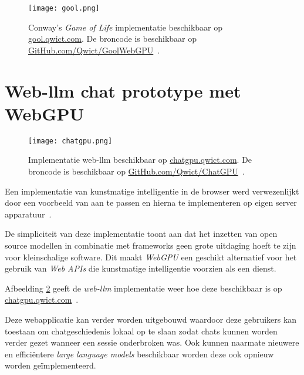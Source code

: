 \begin{figure}
    \texttt{[image: gool.png]}
    \caption[Conway's \textit{Game of Life} implementatie~\autocite{Qwict2024}]{
        Conway's \textit{Game of Life} implementatie beschikbaar op \href{https://gool.qwict.com}{gool.qwict.com}. De broncode is beschikbaar op \href{https://github.com/qwict/GoolWebGPU}{GitHub.com/Qwict/GoolWebGPU}~\autocite{google2023, Qwict2024}.
    }
    \label{fig:Conway's Game of Life}
\end{figure}

\break{}

\iffalse
TODO Dit moet verder in detail worden beschreven
\fi

\section{Web-llm chat prototype met WebGPU}
\label{sec:chatgpu}
\begin{figure}
    \texttt{[image: chatgpu.png]}
    \caption[Implementatie web-llm~\autocite{mlcai2023, Qwict2024a}]{
        Implementatie web-llm beschikbaar op \href{https://chatgpu.qwict.com}{chatgpu.qwict.com}. De broncode is beschikbaar op \href{https://github.com/qwict/chatgpu}{GitHub.com/Qwict/ChatGPU}~\autocite{mlcai2023, Qwict2024a}.
    }
    \label{fig:Implementatie web-llm}
\end{figure}

Een implementatie van kunstmatige intelligentie in de browser werd verwezenlijkt door een voorbeeld van \textcite{mlcai2023} aan te passen en hierna te implementeren op eigen server apparatuur~\autocite{Qwict2024a}.

\bigbreak{}

De simpliciteit van deze implementatie toont aan dat het inzetten van open source modellen in combinatie met frameworks geen grote uitdaging hoeft te zijn voor kleinschalige software. Dit maakt \textit{WebGPU} een geschikt alternatief voor het gebruik van \textit{Web APIs} die kunstmatige intelligentie voorzien als een dienst.

\bigbreak{}

Afbeelding \ref{fig:Implementatie web-llm} geeft de \textit{web-llm} implementatie weer hoe deze beschikbaar is op \href{https://chatgpu.qwict.com}{chatgpu.qwict.com}~\autocite{Qwict2024a}.

\bigbreak{}

Deze webapplicatie kan verder worden uitgebouwd waardoor deze gebruikers kan toestaan om chatgeschiedenis lokaal op te slaan zodat chats kunnen worden verder gezet wanneer een sessie onderbroken was. Ook kunnen naarmate nieuwere en efficiëntere \textit{large language models} beschikbaar worden deze ook opnieuw worden geïmplementeerd.

